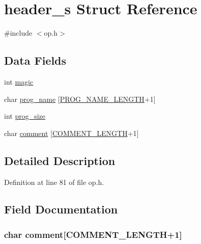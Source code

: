 \hypertarget{structheader__s}{\section{header\-\_\-s Struct Reference}
\label{structheader__s}
}


{\ttfamily \#include $<$op.\-h$>$}

\subsection*{Data Fields}
\begin{DoxyCompactItemize}
\item 
int \hyperlink{structheader__s_a6480f97b5704e0c84200f69c08d46870}{magic}
\item 
char \hyperlink{structheader__s_a397ee88e66607c854d21ac8cf34490db}{prog\-\_\-name} \mbox{[}\hyperlink{op_8h_a2bd1b5655c5d92af5ebe7f4bb3436b73}{P\-R\-O\-G\-\_\-\-N\-A\-M\-E\-\_\-\-L\-E\-N\-G\-T\-H}+1\mbox{]}
\item 
int \hyperlink{structheader__s_ad2581b30c4292bde684ada555e8c23ce}{prog\-\_\-size}
\item 
char \hyperlink{structheader__s_ae6da1ff2fd8abd8f79b0a42acf5b98b9}{comment} \mbox{[}\hyperlink{op_8h_a31a10f5d8e8f9085ce0224cf043cb5fa}{C\-O\-M\-M\-E\-N\-T\-\_\-\-L\-E\-N\-G\-T\-H}+1\mbox{]}
\end{DoxyCompactItemize}


\subsection{Detailed Description}


Definition at line 81 of file op.\-h.



\subsection{Field Documentation}
\hypertarget{structheader__s_ae6da1ff2fd8abd8f79b0a42acf5b98b9}{
\subsubsection[{comment}]{\setlength{\rightskip}{0pt plus 5cm}char comment\mbox{[}{\bf C\-O\-M\-M\-E\-N\-T\-\_\-\-L\-E\-N\-G\-T\-H}+1\mbox{]}}}\label{structheader__s_ae6da1ff2fd8abd8f79b0a42acf5b98b9}


